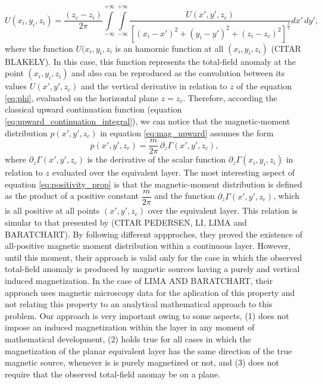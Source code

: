 \begin{equation}
U(x_i,y_i,z_i) = \dfrac{(z_c-z_i)}{2\pi} \int \limits_{-\infty}^{+\infty } \int \limits_{-\infty}^{+\infty }  \dfrac{U(x',y',z_c) }{[(x_i-x')^2 + (y_i-y')^2 + (z_i-z_c)^2]^{\frac{3}{2}}}    dx' \,dy',
\label{eq:upward_continuation_integral}
\end{equation}
where the function $U(x_i,y_i,z_i$ is an hamornic function at all $(x_i,y_i,z_i)$ (CITAR BLAKELY). In this case, this function represents the total-field anomaly at the point $(x_i,y_i,z_i)$ and also can be reproduced as the convolution between its values $U(x',y',z_c)$ and the vertical derivative in relation to $z$ of the equation \ref{eq:phi}, evaluated on the horizontal plane $z=z_c$. Therefore, according the classical upward continuation function (equation \ref{eq:upward_continuation_integral}), we can notice that the magnetic-moment distribution $p(x',y',z_c)$ in equation \ref{eq:mag_upward} assumes the form 
\begin{equation}
p(x',y',z_c) = \dfrac{m}{2\pi} \, \partial_{z} \Gamma(x',y',z_c) ,
\label{eq:positivity_prop}
\end{equation}
where $\partial_{z} \Gamma(x',y',z_c)$ is the derivative of the scalar function $\partial_{z} \Gamma(x_i,y_i,z_i)$ in relation to $z$ evaluated over the equivalent layer. The most interesting aspect of equation \ref{eq:positivity_prop} is that the magnetic-moment distribution is defined as the product of a positive constant $\dfrac{m}{2\pi}$ and the function $\partial_{z} \Gamma(x',y',z_c)$, which is all positive at all points $(x',y',z_c)$ over the equivalent layer. This relation is simular to that presented by (CITAR PEDERSEN, LI, LIMA and BARATCHART). By following different appproches, they proved the existence of all-positive magnetic moment distribution within a continuous layer. However, until this moment, their approach is valid only for the case in which the observed total-field anomaly is produced by magnetic sources having a purely and vertical induced magnetization. In the case of LIMA AND BARATCHART, their approach uses magnetic microscopy data for the aplication of this property and not relating this property to an analytical mathematical approach to this problem. Our approach is very important owing to some aspects, (1) does not impose an induced magnetization within the layer in any moment of mathematical development, (2) holds true for all cases in which the magnetization of the planar equivalent layer has the same direction of the true magnetic source, whenever is is purely magnetized or not, and (3) does not require that the observed total-field anomay be on a plane.            
      
